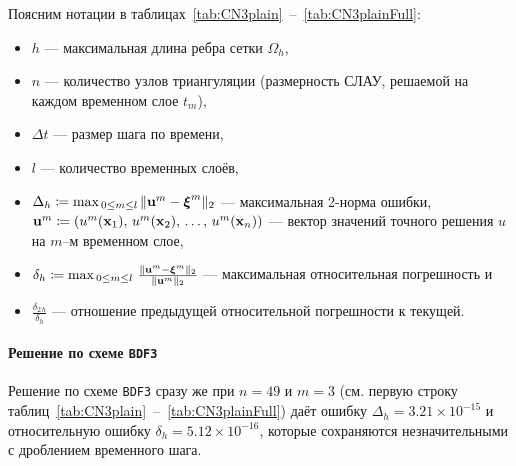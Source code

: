 Поясним нотации в таблицах~\ref{tab:CN3plain}~--~\ref{tab:CN3plainFull}:
\begin{itemize}
	\item $h$ --- максимальная длина ребра сетки $\Omega_h$,
	\item $n$ --- количество узлов триангуляции (размерность СЛАУ, решаемой на каждом временном слое $t_m$),
	\item $\Delta t$ --- размер шага по времени,
	\item $l$ --- количество временных слоёв,
	\item $\Delta_h \coloneqq \max_{\, 0 \le m \le l \,} \lVert\boldsymbol{\mathbf{u}}^m - \boldsymbol{\mathbf{\xi}}^m\rVert_2$ --- максимальная 2-норма ошибки, \\ 
	      $\boldsymbol{\mathbf{u}}^m \coloneqq ( u^m(\boldsymbol{\mathbf{x}}_1), \, u^m(\boldsymbol{\mathbf{x}}_2), \, \dots, \, u^m(\boldsymbol{\mathbf{x}}_n) )$ --- вектор значений точного решения $u$ на $m$--м временном слое,
	\item $\delta_h \coloneqq \max_{\, 0 \le m \le l \,} \frac{\lVert\boldsymbol{\mathbf{u}}^m - \boldsymbol{\mathbf{\xi}}^m\rVert_2}{\lVert\boldsymbol{\mathbf{u}}^m\rVert_2}$ --- максимальная относительная погрешность и 
	\item $\frac{\delta_{2 \, h}}{\delta_h}$ --- отношение предыдущей относительной погрешности к текущей.
\end{itemize}

\paragraph{Решение по схеме \texttt{BDF3}}

Решение по схеме \texttt{BDF3} сразу же при $n = 49$ и $m = 3$ (см. первую строку таблиц~\ref{tab:CN3plain}~--~\ref{tab:CN3plainFull}) даёт ошибку $\Delta_h = 3.21 \times 10^{-15}$ и относительную ошибку $\delta_h = 5.12 \times 10^{-16}$, которые сохраняются незначительными с дроблением временного шага.

